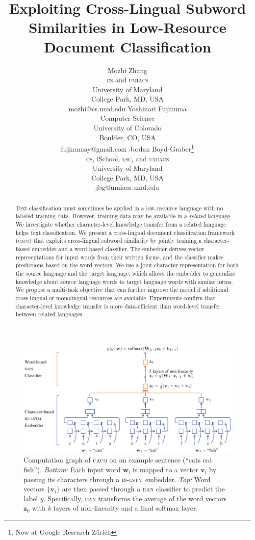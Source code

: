 \documentclass[letterpaper]{article} %
\title{Exploiting Cross-Lingual Subword Similarities in Low-Resource Document
Classification}
\author{Mozhi Zhang \\
\textsc{cs} and \textsc{umiacs} \\
University of Maryland \\
College Park, MD, USA \\
mozhi@cs.umd.edu
\And
Yoshinari Fujinuma \\
Computer Science \\
University of Colorado \\
Boulder, CO, USA \\
fujinumay@gmail.com
\And
Jordan Boyd-Graber\thanks{Now at Google Research Z\"urich} \\
\textsc{cs}, iSchool, \textsc{lsc}, and \textsc{umiacs}\\
University of Maryland \\
College Park, MD, USA \\
jbg@umiacs.umd.edu \\}
\newcommand{\abr}[1]{\textsc{#1}}
\newcommand{\vect}[1]{\bm{\mathbf{#1}}}
\newcommand{\name}[0]{\textsc{caco}}
\begin{document}
\maketitle
\begin{abstract}

Text classification must sometimes be applied in a low-resource language with
no labeled training data.
However, training data may be available in a \emph{related} language.
We investigate whether character-level knowledge transfer from a related
language helps text classification.
We present a cross-lingual document classification framework (\name{}) that
exploits cross-lingual subword similarity by jointly training a
character-based embedder and a word-based classifier.
The embedder derives vector representations for input words from their
written forms, and the classifier makes predictions based on the word
vectors.
We use a joint character representation for both the source language and the
target language, which allows the embedder to generalize knowledge about
source language words to target language words with similar forms.
We propose a multi-task objective that can further improve the model if
additional cross-lingual or monolingual resources are available.
Experiments confirm that character-level knowledge transfer is more
data-efficient than word-level transfer between related languages.

\end{abstract}

\begin{figure}
\centering
\includegraphics[width=.9\textwidth]{architecture.pdf}
\caption{\label{fig:model} Computation graph of \name{} on an example
sentence (``cats eat fish'').
\emph{Bottom:} Each input word $\vect{w}_i$ is mapped to a vector $\vect{v}_i$
by passing its characters through a \abr{bi-lstm} embedder.
\emph{Top:} Word vectors $\{\vect{v_i}\}$ are then passed through a \abr{dan}
classifier to predict the label $y$.
Specifically, \abr{dan} transforms the average of the word vectors
$\vect{z}_0$ with $k$ layers of non-linearity and a final softmax layer.}
\end{figure}
\end{document}
